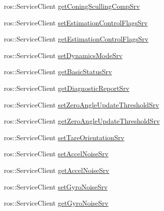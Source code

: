\begin{DoxyCompactItemize}
\item 
ros\+::\+Service\+Client \hyperlink{classcl__microstrain__mips__client_1_1ClMicrostainMips_a55089b40c0c56c4d3186f84c1f5fb5ad}{get\+Coning\+Sculling\+Comp\+Srv}
\item 
ros\+::\+Service\+Client \hyperlink{classcl__microstrain__mips__client_1_1ClMicrostainMips_a1b440add6a87fd740f5b8f5bbf00fb03}{set\+Estimation\+Control\+Flags\+Srv}
\item 
ros\+::\+Service\+Client \hyperlink{classcl__microstrain__mips__client_1_1ClMicrostainMips_a8bba69fdd3bcc2b76c3fbbf5e0c5d6db}{get\+Estimation\+Control\+Flags\+Srv}
\item 
ros\+::\+Service\+Client \hyperlink{classcl__microstrain__mips__client_1_1ClMicrostainMips_affa9d7bf19143f5b99544ff52a9aa7b6}{set\+Dynamics\+Mode\+Srv}
\item 
ros\+::\+Service\+Client \hyperlink{classcl__microstrain__mips__client_1_1ClMicrostainMips_ac991f736b5873d50d5b1050ad5ca7ce9}{get\+Basic\+Status\+Srv}
\item 
ros\+::\+Service\+Client \hyperlink{classcl__microstrain__mips__client_1_1ClMicrostainMips_a63f2304a6fd551e814f9c4906e2b92aa}{get\+Diagnostic\+Report\+Srv}
\item 
ros\+::\+Service\+Client \hyperlink{classcl__microstrain__mips__client_1_1ClMicrostainMips_a44d26e3c3ec005e1a8c04c40c7ef49f3}{set\+Zero\+Angle\+Update\+Threshold\+Srv}
\item 
ros\+::\+Service\+Client \hyperlink{classcl__microstrain__mips__client_1_1ClMicrostainMips_aa6b984832ce7460569ce4f81982a6b8a}{get\+Zero\+Angle\+Update\+Threshold\+Srv}
\item 
ros\+::\+Service\+Client \hyperlink{classcl__microstrain__mips__client_1_1ClMicrostainMips_a849efd6cd110868c64ba0d1d2ad3c94f}{set\+Tare\+Orientation\+Srv}
\item 
ros\+::\+Service\+Client \hyperlink{classcl__microstrain__mips__client_1_1ClMicrostainMips_a65dbc3c556c40293cc3e188bfd632243}{set\+Accel\+Noise\+Srv}
\item 
ros\+::\+Service\+Client \hyperlink{classcl__microstrain__mips__client_1_1ClMicrostainMips_a0e216421596a37cc683a07c386e16190}{get\+Accel\+Noise\+Srv}
\item 
ros\+::\+Service\+Client \hyperlink{classcl__microstrain__mips__client_1_1ClMicrostainMips_a1aeec41e9b94e04310e260104e389c93}{set\+Gyro\+Noise\+Srv}
\item 
ros\+::\+Service\+Client \hyperlink{classcl__microstrain__mips__client_1_1ClMicrostainMips_a1e6400fa4d1a3a0ccdfa0e8064c4a62c}{get\+Gyro\+Noise\+Srv}

\end{DoxyCompactItemize}
